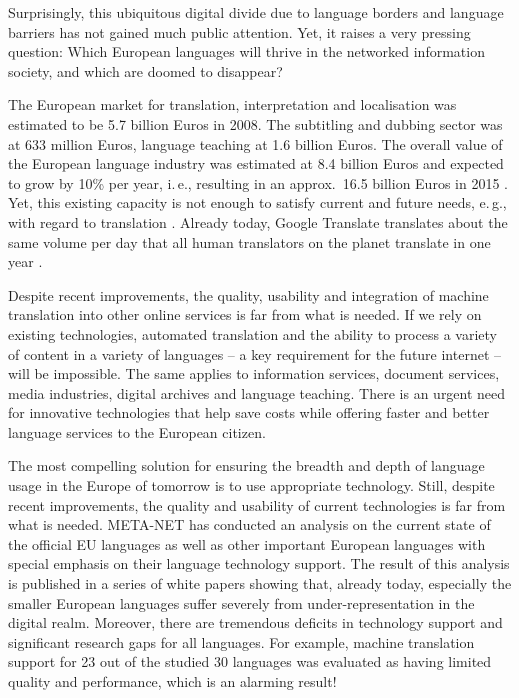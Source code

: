 \documentclass[10pt, plain]{../../metanetpaper}
\begin{document}
\begin{multicols}{2}
Surprisingly, this ubiquitous digital divide due to language borders and language barriers has not gained much public attention. Yet, it raises a very pressing question: Which European languages will thrive in the networked information society, and which are doomed to disappear?

The European market for translation, interpretation and localisation was estimated to be 5.7 billion Euros in 2008. The subtitling and dubbing sector was at 633 million Euros, language teaching at 1.6 billion Euros. The overall value of the European language industry was estimated at 8.4 billion Euros and expected to grow by 10\% per year, i.\,e., resulting in an approx.~16.5 billion Euros in 2015 \cite{EC3}. Yet, this existing capacity is not enough to satisfy current and future needs, e.\,g., with regard to translation \cite{csa2009}. Already today, Google Translate translates about the same volume per day that all human translators on the planet translate in one year \cite{och12}.

Despite recent improvements, the quality, usability and integration of machine translation into other online services is far from what is needed. If we rely on existing technologies, automated translation and the ability to process a variety of content in a variety of languages -- a key requirement for the future internet -- will be impossible. The same applies to information services, document services, media industries, digital archives and language teaching. There is an urgent need for innovative technologies that help save costs while offering faster and better language services to the European citizen.

The most compelling solution for ensuring the breadth and depth of language usage in the Europe of tomorrow is to use appropriate technology. Still, despite recent improvements, the quality and usability of current technologies is far from what is needed. META-NET has conducted an analysis on the current state of the official EU languages as well as other important European languages with special emphasis on their language technology support. The result of this analysis is published in a series of white papers \cite{LWP2012} showing that, already today, especially the smaller European languages suffer severely from under-representation in the digital realm. Moreover, there are tremendous deficits in technology support and significant research gaps for all languages. For example, machine translation support for 23 out of the studied 30 languages was evaluated as having limited quality and performance, which is an alarming result! 


\end{multicols}
\end{document}
